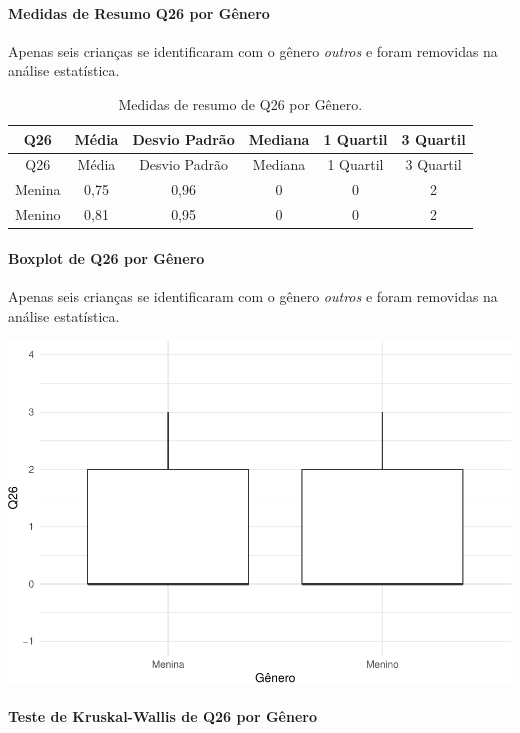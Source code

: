\documentclass[]{article}
\let\oldparagraph\paragraph
\renewcommand{\paragraph}[1]{\oldparagraph{#1}\mbox{}}
\begin{document}
\hypertarget{medidas-de-resumo-q26-por-guxeanero}{%
\paragraph{Medidas de Resumo Q26 por Gênero}\label{medidas-de-resumo-q26-por-guxeanero}}

Apenas seis crianças se identificaram com o gênero \emph{outros} e foram removidas na análise estatística.

\begin{longtable}[]{@{}cccccc@{}}
\caption{\label{tab:unnamed-chunk-734}Medidas de resumo de Q26 por Gênero.}\tabularnewline
\toprule
Q26 & Média & Desvio Padrão & Mediana & 1 Quartil & 3 Quartil\tabularnewline
\midrule
\endfirsthead
\toprule
Q26 & Média & Desvio Padrão & Mediana & 1 Quartil & 3 Quartil\tabularnewline
\midrule
\endhead
Menina & 0,75 & 0,96 & 0 & 0 & 2\tabularnewline
Menino & 0,81 & 0,95 & 0 & 0 & 2\tabularnewline
\bottomrule
\end{longtable}

\hypertarget{boxplot-de-q26-por-guxeanero}{%
\paragraph{Boxplot de Q26 por Gênero}\label{boxplot-de-q26-por-guxeanero}}

Apenas seis crianças se identificaram com o gênero \emph{outros} e foram removidas na análise estatística.

\begin{center}\includegraphics[width=0.75\linewidth]{relatorio_covid19_files/figure-latex/unnamed-chunk-735-1} \end{center}

\hypertarget{teste-de-kruskal-wallis-de-q26-por-guxeanero}{%
\paragraph{Teste de Kruskal-Wallis de Q26 por Gênero}\label{teste-de-kruskal-wallis-de-q26-por-guxeanero}}
\end{document}
